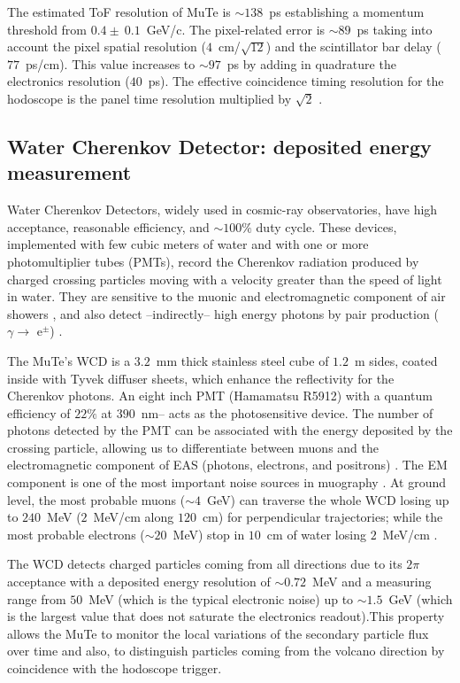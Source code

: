 \documentclass[letterpaper,11pt]{article}
\begin{document}
The estimated ToF resolution of MuTe is $\sim138$~ps establishing a momentum threshold from $0.4\pm~0.1$~GeV/c. The pixel-related error is $\sim89$~ps taking into account the pixel spatial resolution ($4$~cm/$\sqrt{12}$) and the scintillator bar delay ($77$~ps/cm). This value increases to $\sim97$~ps by adding in quadrature the electronics resolution ($40$~ps). The effective coincidence timing resolution for the hodoscope is the panel time resolution multiplied by $\sqrt{2}$ \cite{Moses2010}. 

\subsection{Water Cherenkov Detector: deposited energy measurement}

Water Cherenkov Detectors, widely used in cosmic-ray observatories, have high acceptance, reasonable efficiency, and $\sim 100\%$ duty cycle. These devices, implemented with few cubic meters of water and with one or more photomultiplier tubes (PMTs), record the Cherenkov radiation produced by charged crossing particles moving with a velocity greater than the speed of light in water. They are sensitive to the muonic and electromagnetic component of air showers \cite{Auger2015}, and also detect --indirectly-- high energy photons by pair production ($\gamma \rightarrow$ e$^{\pm}$) \cite{allard2007detecting, allard2008use, allekotte2008surface}. 

The MuTe's WCD is a $3.2$~mm thick stainless steel cube of $1.2$~m sides, coated inside with Tyvek diffuser sheets, which enhance the reflectivity for the Cherenkov photons. An eight inch PMT (Hamamatsu R5912) with a quantum efficiency of $22\%$ at $390$~nm-- acts as the photosensitive device. The number of photons detected by the PMT can be associated with the energy deposited by the crossing particle, allowing us to differentiate between muons and the electromagnetic component of EAS (photons, electrons, and positrons) \cite{Billoir2014}. The EM component is one of the most important noise sources in muography \cite{KUSAGAYA2015, Nishiyama2014Noise, Marteau2012Noise}. At ground level, the most probable muons ($\sim 4$~GeV) can traverse the whole WCD losing up to $240$~MeV ($2$~MeV/cm along $120$~cm) for perpendicular trajectories; while the most probable electrons ($\sim 20$~MeV) stop in $10$~cm of water losing $2$~MeV/cm  \cite{groom2001muon,groom2000passage,lohmann1985energy,olive2014passage,Vasquez2018, Motta2018}.

The WCD detects charged particles coming from all directions due to its $2\pi$ acceptance with a deposited energy resolution of $\sim 0.72$~MeV and a measuring range from $50$~MeV (which is the typical electronic noise) up to $\sim 1.5$~GeV (which is the largest value that does not saturate the electronics readout).This property allows the MuTe to monitor the local variations of the secondary particle flux over time \cite{Leon2018} and also, to distinguish particles coming from the volcano direction by coincidence with the hodoscope trigger. 
\end{document}
